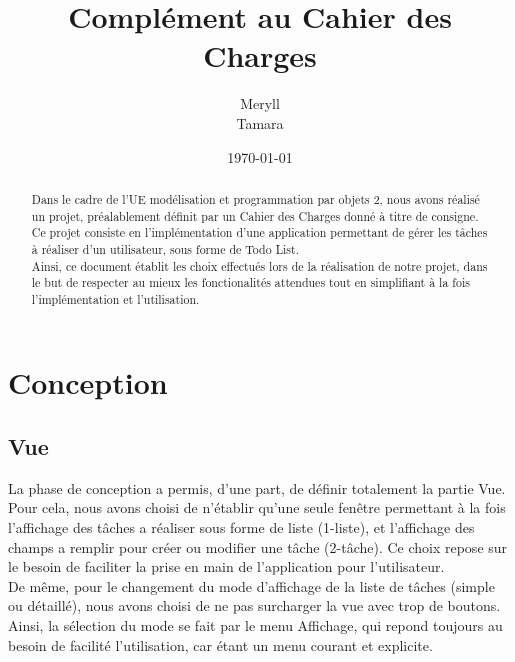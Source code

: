\documentclass[a4paper,10pt]{article}
\author{Meryll \bsc{Essig}\\ Tamara \bsc{Rocacher}}
\date{\today}
\title{Complément au Cahier des Charges}
\begin{document}
\vfill
\maketitle
\vfill
\renewcommand{\abstractname}{Introduction}
\begin{abstract}
Dans le cadre de l'UE modélisation et programmation par objets 2, nous avons réalisé un projet, préalablement définit par un Cahier des Charges donné à titre de consigne.\\
Ce projet consiste en l'implémentation d'une application permettant de gérer les tâches à réaliser d'un utilisateur, sous forme de Todo List.\\
Ainsi, ce document établit les choix effectués lors de la réalisation de notre projet, dans le but de respecter au mieux les fonctionalités attendues tout en simplifiant à la fois l'implémentation et l'utilisation.
\end{abstract}
\vfill
\newpage
\renewcommand{\contentsname}{Sommaire}
\tableofcontents

\newpage

\section{Conception}
\subsection{Vue}
La phase de conception a permis, d'une part, de définir totalement la partie Vue.
Pour cela, nous avons choisi de n'établir qu'une seule fenêtre permettant à la fois l'affichage des tâches a réaliser sous forme de liste (1-liste), et l'affichage des champs a remplir pour créer ou modifier une tâche (2-tâche).
Ce choix repose sur le besoin de faciliter la prise en main de l'application pour l'utilisateur.
\\
De même, pour le changement du mode d'affichage de la liste de tâches (simple ou détaillé), nous avons choisi de ne pas surcharger la vue avec trop de boutons. Ainsi, la sélection du mode se fait par le menu Affichage, qui repond toujours au besoin de facilité l'utilisation, car étant un menu courant et explicite.
\\
\end{document}
